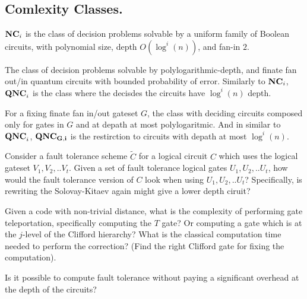 \documentclass[manuscript,screen,review]{acmart}
\begin{document}
{\subsection{Comlexity Classes.}



\begin{definition}
$\mathbf{NC}_i$ is the class of decision problems solvable by a uniform family of Boolean circuits, with polynomial size, depth $O(\log^i(n))$, and fan-in $2$. 
\end{definition}

\begin{definition}[$\QNC$]
  The class of decision problems solvable by polylogarithmic-depth, and finate fan out/in quantum circuits with bounded probability of error. Similarly to $\mathbf{NC}_i$, $\mathbf{QNC}_i$ is the class where the decisdes the circuits have $\log^i (n)$ depth.  
\end{definition}

\begin{definition}[$\QNCG$]
  For a fixing finate fan in/out gateset $G$, the class with deciding circuits composed only for gates in $G$ and at depath at most polylogaritmic. And in similar to $\mathbf{QNC}_{i}$, $\mathbf{QNC_{G,i}}$ is the restirction to circuits with depath at most $\log^{i}(n)$.  
\end{definition}

\begin{openproblem}
Consider a fault tolerance scheme $\tilde{C}$ for a logical circuit $C$ which uses the logical gateset $V_{1}, V_{2}, .. V_{t}$. Given a set of fault tolerance logical gates $U_{1}, U_{2}, .. U_{t}$, how would the fault tolerance version of $C$ look when using $U_{1}, U_{2}, .. U_{t}$? Specifically, is rewriting the Solovay-Kitaev again might give a lower depth ciruit?
\end{openproblem}

\begin{openproblem}
Given a code with non-trivial distance, what is the complexity of performing gate teleportation, specifically computing the $T$ gate? Or computing a gate which is at the $j$-level of the Clifford hierarchy? What is the classical computation time needed to perform the correction? (Find the right Clifford gate for fixing the computation).
\end{openproblem}

\begin{openproblem}
Is it possible to compute fault tolerance without paying a significant overhead at the depth of the circuits?
\end{openproblem}


}
\end{document}
